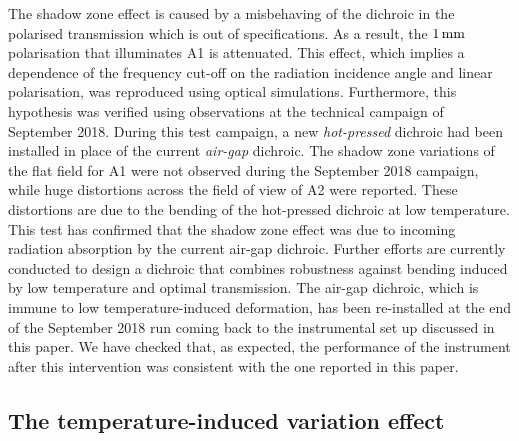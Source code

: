 The shadow zone effect is caused by {\lp a misbehaving of the dichroic in
the polarised transmission which is out of specifications. As a
result, the $1\,\rm{mm}$ polarisation that illuminates A1 is
attenuated.}
This effect,
which implies %
{\lp a dependence of the frequency cut-off on the radiation
incidence angle and linear polarisation,}
was reproduced using optical simulations. Furthermore, this hypothesis was
verified using observations at the technical campaign of September
2018. During this test campaign, a new \emph{hot-pressed} dichroic had
been installed in place of the current \emph{air-gap} dichroic.
%
%
The shadow zone variations of the flat field for A1 were
not observed during the September 2018 campaign, while huge distortions
across the field of view of A2 were reported. These distortions are
due to the bending of the hot-pressed dichroic at low temperature.
This test has confirmed that the shadow zone effect was due
to incoming radiation absorption by the current air-gap dichroic.
Further efforts are currently conducted to design a dichroic that
combines robustness against bending induced by low temperature and
optimal transmission.
{\lp The air-gap dichroic, which is immune to low temperature-induced
deformation, has been re-installed at the end of the September 2018
run coming back to the instrumental set up discussed in this paper. We
have checked that, as expected, the performance of the instrument
after this intervention was consistent with the one reported in this
paper.}


\subsection{The temperature-induced variation effect}
\label{se:beam_variation}

